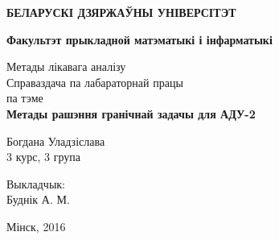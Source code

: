 \begin{titlepage}
    \begin{center}
        {\bf БЕЛАРУСКІ ДЗЯРЖАЎНЫ УНІВЕРСІТЭТ}
    \end{center}
    \begin{center}
        {\bf Факультэт прыкладной матэматыкі і інфарматыкі}
    \end{center}

    \vspace{15em}

    \begin{center}
        {\LARGE Метады лікавага аналізу} \\
        \vspace{5mm}
        {\LARGE Справаздача па лабараторнай працы} \\
        {\large па тэме} \\
        \vspace{5mm}
        {\bf \LARGE Метады рашэння гранічнай задачы для АДУ-2}
    \end{center}

    \vspace{12em}

    \begin{flushright}
        \LARGE{
        Богдана Уладзіслава\\
        3 курс, 3 група\\}
    \end{flushright}

    \vspace{5em}

    \begin{flushright}
        \LARGE{
        Выкладчык:\\
        Буднік А. М.\\}
    \end{flushright}
    
    \vfill

    \begin{center}
        {\LARGE Мінск, 2016}
    \end{center}
\end{titlepage}
\newpage
